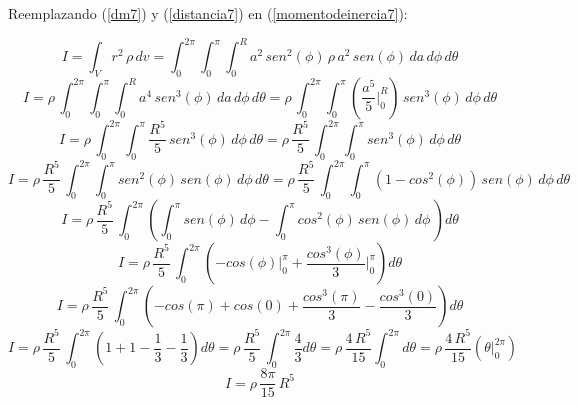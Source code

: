 \documentclass[letter,11pt]{article}
\begin{document}
Reemplazando (\ref{dm7}) y (\ref{distancia7}) en (\ref{momentodeinercia7}): 

\begin{equation*}
    I = \int_{V} r^2\, \rho\, dv = \int_{0}^{2\pi} \int_{0}^{\pi} \int_{0}^{R} a^2\, sen^2(\phi)\, \rho\, a^2\, sen (\phi)\, da\, d\phi\, d\theta
\end{equation*}
\begin{equation*}
    I = \rho\, \int_{0}^{2\pi} \int_{0}^{\pi} \int_{0}^{R} a^4\, sen^3(\phi)\, da\, d\phi\, d\theta = \rho\, \int_{0}^{2\pi} \int_{0}^{\pi} \left(\frac{a^5}{5}\Biggr|_{0}^{R}\right)\, sen^3(\phi)\, d\phi\, d\theta
\end{equation*}
\begin{equation*}
    I = \rho\, \int_{0}^{2\pi} \int_{0}^{\pi} \frac{R^5}{5}\, sen^3(\phi)\, d\phi\, d\theta = \rho\, \frac{R^5}{5}\, \int_{0}^{2\pi} \int_{0}^{\pi} sen^3(\phi)\, d\phi\, d\theta
\end{equation*}
\begin{equation*}
    I = \rho\, \frac{R^5}{5}\, \int_{0}^{2\pi} \int_{0}^{\pi} sen^2(\phi)\, sen(\phi)\, d\phi\, d\theta = \rho\, \frac{R^5}{5}\, \int_{0}^{2\pi} \int_{0}^{\pi} (1 - cos^2(\phi))\, sen(\phi)\, d\phi\, d\theta
\end{equation*}
\begin{equation*}
    I = \rho\, \frac{R^5}{5}\, \int_{0}^{2\pi} \left( \int_{0}^{\pi} sen(\phi)\, d\phi - \int_{0}^{\pi} cos^2(\phi)\, sen(\phi)\, d\phi\, \right) d\theta
\end{equation*}
\begin{equation*}
    I = \rho\, \frac{R^5}{5}\, \int_{0}^{2\pi} \left( -cos(\phi)\Biggr|_{0}^{\pi} + \frac{cos^3(\phi)}{3}\Biggr|_{0}^{\pi} \right) d\theta
\end{equation*}
\begin{equation*}
    I = \rho\, \frac{R^5}{5}\, \int_{0}^{2\pi} \left( -cos(\pi) + cos(0) + \frac{cos^3(\pi)}{3} - \frac{cos^3(0)}{3} \right) d\theta
\end{equation*}
\begin{equation*}
    I = \rho\, \frac{R^5}{5}\, \int_{0}^{2\pi} \left( 1 + 1 - \frac{1}{3} - \frac{1}{3} \right) d\theta = \rho\, \frac{R^5}{5}\, \int_{0}^{2\pi} \frac{4}{3} d\theta = \rho\, \frac{4\, R^5}{15} \int_{0}^{2\pi} d\theta = \rho\, \frac{4\, R^5}{15} ( \theta \Biggr|_{0}^{2\pi} )
\end{equation*}
\begin{equation}
    I = \rho\, \frac{8\pi}{15}\, R^5
\label{resultado7}
\end{equation}
\end{document}
